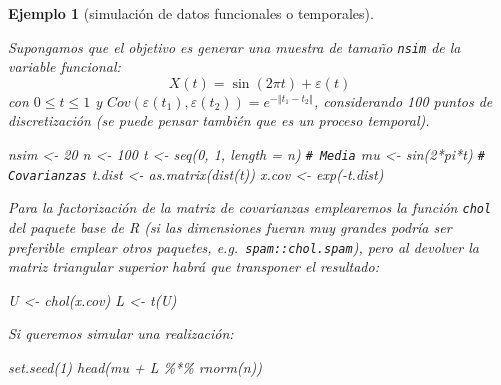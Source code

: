 \documentclass[
]{book}
\newenvironment{Shaded}{\begin{snugshade}}{\end{snugshade}}
\newcommand{\AttributeTok}[1]{\textcolor[rgb]{0.77,0.63,0.00}{#1}}
\newcommand{\CommentTok}[1]{\textcolor[rgb]{0.56,0.35,0.01}{\textit{#1}}}
\newcommand{\DecValTok}[1]{\textcolor[rgb]{0.00,0.00,0.81}{#1}}
\newcommand{\FunctionTok}[1]{\textcolor[rgb]{0.00,0.00,0.00}{#1}}
\newcommand{\NormalTok}[1]{#1}
\newcommand{\OtherTok}[1]{\textcolor[rgb]{0.56,0.35,0.01}{#1}}
\newcommand{\SpecialCharTok}[1]{\textcolor[rgb]{0.00,0.00,0.00}{#1}}
\theoremstyle{break}
\newtheorem{example}{Ejemplo}[chapter]
\theoremstyle{nonumberplain}
\renewcommand{\CommentTok}[1]{\textcolor[rgb]{0.41,0.41,0.41}{\texttt{#1}}}
\begin{document}
\begin{example}[simulación de datos funcionales o temporales]
\protect\hypertarget{exm:funcional}{}\label{exm:funcional}

Supongamos que el objetivo es generar una muestra de tamaño \texttt{nsim} de la variable funcional:
\[X(t)=\sin\left(  2\pi t\right)  +\varepsilon\left(  t\right)\]
con \(0\leq t \leq1\) y \(Cov(\varepsilon\left( t_1 \right) , \varepsilon\left( t_2 \right) ) = e^{-\left\Vert t_1-t_2 \right\Vert }\),
considerando 100 puntos de discretización (se puede pensar también que es un proceso temporal).

\begin{Shaded}
\begin{Highlighting}[]
\NormalTok{nsim }\OtherTok{\textless{}{-}} \DecValTok{20}
\NormalTok{n }\OtherTok{\textless{}{-}} \DecValTok{100}
\NormalTok{t }\OtherTok{\textless{}{-}} \FunctionTok{seq}\NormalTok{(}\DecValTok{0}\NormalTok{, }\DecValTok{1}\NormalTok{, }\AttributeTok{length =}\NormalTok{ n)}
\CommentTok{\# Media}
\NormalTok{mu }\OtherTok{\textless{}{-}} \FunctionTok{sin}\NormalTok{(}\DecValTok{2}\SpecialCharTok{*}\NormalTok{pi}\SpecialCharTok{*}\NormalTok{t)}
\CommentTok{\# Covarianzas}
\NormalTok{t.dist }\OtherTok{\textless{}{-}} \FunctionTok{as.matrix}\NormalTok{(}\FunctionTok{dist}\NormalTok{(t))}
\NormalTok{x.cov }\OtherTok{\textless{}{-}} \FunctionTok{exp}\NormalTok{(}\SpecialCharTok{{-}}\NormalTok{t.dist)}
\end{Highlighting}
\end{Shaded}

Para la factorización de la matriz de covarianzas emplearemos la función \texttt{chol}
del paquete base de R (si las dimensiones fueran muy grandes podría ser preferible emplear
otros paquetes, e.g.~\texttt{spam::chol.spam}), pero al devolver la matriz triangular superior
habrá que transponer el resultado:

\begin{Shaded}
\begin{Highlighting}[]
\NormalTok{U }\OtherTok{\textless{}{-}} \FunctionTok{chol}\NormalTok{(x.cov)}
\NormalTok{L }\OtherTok{\textless{}{-}} \FunctionTok{t}\NormalTok{(U)}
\end{Highlighting}
\end{Shaded}

Si queremos simular una realización:

\begin{Shaded}
\begin{Highlighting}[]
\FunctionTok{set.seed}\NormalTok{(}\DecValTok{1}\NormalTok{)}
\FunctionTok{head}\NormalTok{(mu }\SpecialCharTok{+}\NormalTok{ L }\SpecialCharTok{\%*\%} \FunctionTok{rnorm}\NormalTok{(n))}
\end{Highlighting}
\end{Shaded}


\end{example}
\end{document}
